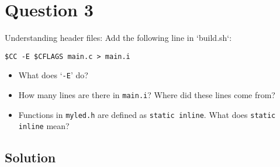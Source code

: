 \section*{Question 3}

Understanding header files:
Add the following line in `build.sh`:
\begin{verbatim}
$CC -E $CFLAGS main.c > main.i
\end{verbatim}
\begin{itemize}[noitemsep]
    \item What does `\texttt{-E}' do?
    \item How many lines are there in \texttt{main.i}? Where did these lines come from?
    \item Functions in \texttt{myled.h} are defined as \texttt{static inline}.
          What does \texttt{static inline} mean?
\end{itemize}

\subsection*{Solution}
